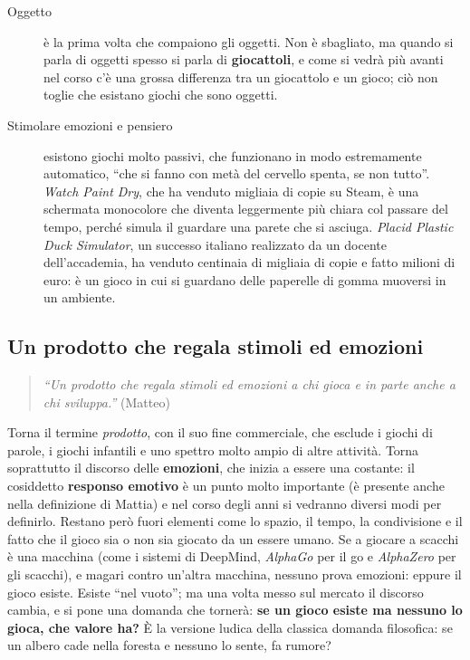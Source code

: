 \begin{description}
  \item[Oggetto] è la prima volta che compaiono gli oggetti. Non è sbagliato,
        ma quando si parla di oggetti spesso si parla di \textbf{giocattoli},
        e come si vedrà più avanti nel corso c'è una grossa differenza tra un
        giocattolo e un gioco; ciò non toglie che esistano giochi che sono
        oggetti.
  \item[Stimolare emozioni e pensiero] esistono giochi molto passivi, che
        funzionano in modo estremamente automatico, ``che si fanno con metà
        del cervello spenta, se non tutto''. \emph{Watch Paint Dry}, che ha
        venduto migliaia di copie su Steam, è una schermata monocolore che
        diventa leggermente più chiara col passare del tempo, perché simula il
        guardare una parete che si asciuga. \emph{Placid Plastic Duck
        Simulator}, un successo italiano realizzato da un docente
        dell'accademia, ha venduto centinaia di migliaia di copie e fatto
        milioni di euro: è un gioco in cui si guardano delle paperelle di gomma
        muoversi in un ambiente.
\end{description}

\subsection{Un prodotto che regala stimoli ed emozioni}

\begin{quote}
\emph{``Un prodotto che regala stimoli ed emozioni a chi gioca e in parte anche
a chi sviluppa.''} (Matteo)
\end{quote}

Torna il termine \emph{prodotto}, con il suo fine commerciale, che esclude i
giochi di parole, i giochi infantili e uno spettro molto ampio di altre
attività. Torna soprattutto il discorso delle \textbf{emozioni}, che inizia a
essere una costante: il cosiddetto \textbf{responso emotivo} è un punto molto
importante (è presente anche nella definizione di Mattia) e nel corso degli
anni si vedranno diversi modi per definirlo. Restano però fuori elementi come
lo spazio, il tempo, la condivisione e il fatto che il gioco sia o non sia
giocato da un essere umano. Se a giocare a scacchi è una macchina (come i
sistemi di DeepMind, \emph{AlphaGo} per il go e \emph{AlphaZero} per gli
scacchi), e magari contro un'altra macchina, nessuno prova emozioni: eppure il
gioco esiste. Esiste ``nel vuoto''; ma una volta messo sul mercato il discorso
cambia, e si pone una domanda che tornerà: \textbf{se un gioco esiste ma
nessuno lo gioca, che valore ha?} È la versione ludica della classica domanda
filosofica: se un albero cade nella foresta e nessuno lo sente, fa rumore?

